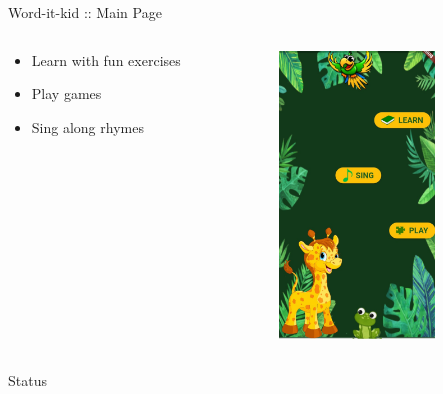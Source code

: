 \documentclass[14pt]{beamer}
\begin{document}
\begin{frame}{Word-it-kid :: Main Page}
    \begin{columns}
    \begin{column}{0.4\textwidth}
        \begin{itemize}
            \item Learn with fun exercises \\
            \item Play games \\
            \item Sing along rhymes
        \end{itemize}
    \end{column}
    \begin{column}{0.6\textwidth}
        \begin{figure}[ht]
        \includegraphics[height=3in]{RedirectionPage.jpeg}
        \end{figure}
    \end{column}
    \end{columns}
\end{frame}

\begin{frame}{Status}
\end{frame}
\end{document}

